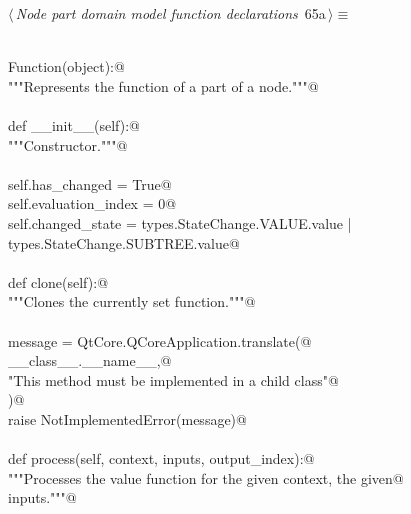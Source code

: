 \documentclass[
    a4paper,      %
    10pt,         %
    openright,    %
    notitlepage,  %
    parskip=half, %
]{scrreprt}       %
\theoremstyle{definition}                    %
\begin{document}
\begin{flushleft} \small
\begin{minipage}{\linewidth}\label{scrap108}\raggedright\small
{} $\langle\,${\itshape Node part domain model function declarations}\nobreak\ {\footnotesize {65a}}$\,\rangle\equiv$
\vspace{-1exm}
\begin{list}{}{} \item
\mbox{}\lstinline@@\\
\mbox{}\lstinline@class Function(object):@\\
\mbox{}\lstinline@    """Represents the function of a part of a node."""@\\
\mbox{}\lstinline@@\\
\mbox{}\lstinline@    def __init__(self):@\\
\mbox{}\lstinline@        """Constructor."""@\\
\mbox{}\lstinline@@\\
\mbox{}\lstinline@        self.has_changed = True@\\
\mbox{}\lstinline@        self.evaluation_index = 0@\\
\mbox{}\lstinline@        self.changed_state = types.StateChange.VALUE.value | types.StateChange.SUBTREE.value@\\
\mbox{}\lstinline@@\\
\mbox{}\lstinline@    def clone(self):@\\
\mbox{}\lstinline@        """Clones the currently set function."""@\\
\mbox{}\lstinline@@\\
\mbox{}\lstinline@        message = QtCore.QCoreApplication.translate(@\\
\mbox{}\lstinline@            __class__.__name__,@\\
\mbox{}\lstinline@            "This method must be implemented in a child class"@\\
\mbox{}\lstinline@        )@\\
\mbox{}\lstinline@        raise NotImplementedError(message)@\\
\mbox{}\lstinline@@\\
\mbox{}\lstinline@    def process(self, context, inputs, output_index):@\\
\mbox{}\lstinline@        """Processes the value function for the given context, the given@\\
\mbox{}\lstinline@        inputs."""@\\
\mbox{}\lstinline@@\\

\end{list}
\end{minipage}
\end{flushleft}
\end{document}
